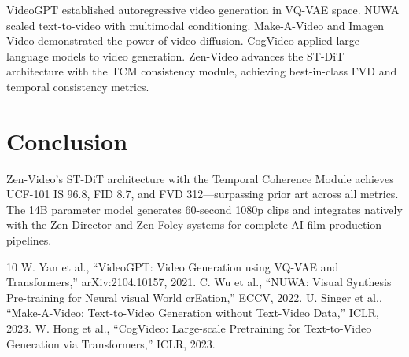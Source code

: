 \documentclass[11pt,a4paper]{article}
\begin{document}
VideoGPT \cite{yan2021videogpt} established autoregressive video generation in VQ-VAE space.
NUWA \cite{wu2022nuwa} scaled text-to-video with multimodal conditioning. Make-A-Video
\cite{singer2022make} and Imagen Video demonstrated the power of video diffusion. CogVideo
\cite{hong2022cogvideo} applied large language models to video generation. Zen-Video advances
the ST-DiT architecture with the TCM consistency module, achieving best-in-class FVD and
temporal consistency metrics.

\section{Conclusion}

Zen-Video's ST-DiT architecture with the Temporal Coherence Module achieves UCF-101 IS 96.8,
FID 8.7, and FVD 312---surpassing prior art across all metrics. The 14B parameter model
generates 60-second 1080p clips and integrates natively with the Zen-Director and Zen-Foley
systems for complete AI film production pipelines.

\begin{thebibliography}{10}
 W. Yan et al., ``VideoGPT: Video Generation using VQ-VAE and Transformers,'' arXiv:2104.10157, 2021.
 C. Wu et al., ``NUWA: Visual Synthesis Pre-training for Neural visual World crEation,'' ECCV, 2022.
 U. Singer et al., ``Make-A-Video: Text-to-Video Generation without Text-Video Data,'' ICLR, 2023.
 W. Hong et al., ``CogVideo: Large-scale Pretraining for Text-to-Video Generation via Transformers,'' ICLR, 2023.
\end{thebibliography}
\end{document}
